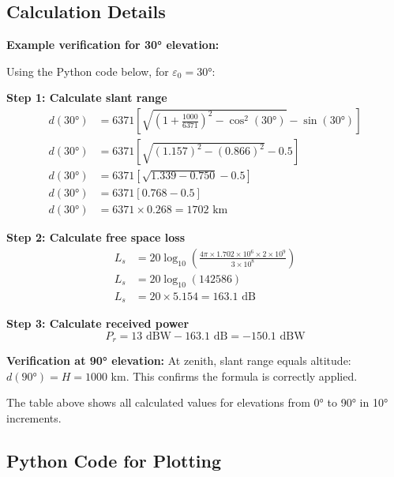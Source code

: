 \documentclass[11pt,letterpaper]{article}
\begin{document}
\subsection{Calculation Details}

\textbf{Example verification for 30° elevation:}

Using the Python code below, for $\varepsilon_0 = 30°$:

\textbf{Step 1: Calculate slant range}
\begin{align}
d(30°) &= 6371 \left[\sqrt{\left(1 + \frac{1000}{6371}\right)^2 - \cos^2(30°)} - \sin(30°)\right] \\
d(30°) &= 6371 \left[\sqrt{(1.157)^2 - (0.866)^2} - 0.5\right] \\
d(30°) &= 6371 \left[\sqrt{1.339 - 0.750} - 0.5\right] \\
d(30°) &= 6371 \left[0.768 - 0.5\right] \\
d(30°) &= 6371 \times 0.268 = 1702 \text{ km}
\end{align}

\textbf{Step 2: Calculate free space loss}
\begin{align}
L_s &= 20 \log_{10}\left(\frac{4\pi \times 1.702 \times 10^6 \times 2 \times 10^9}{3 \times 10^8}\right) \\
L_s &= 20 \log_{10}(142586) \\
L_s &= 20 \times 5.154 = 163.1 \text{ dB}
\end{align}

\textbf{Step 3: Calculate received power}
\begin{equation}
P_r = 13 \text{ dBW} - 163.1 \text{ dB} = -150.1 \text{ dBW}
\end{equation}

\textbf{Verification at 90° elevation:} At zenith, slant range equals altitude: $d(90°) = H = 1000$ km. This confirms the formula is correctly applied.

The table above shows all calculated values for elevations from 0° to 90° in 10° increments.

\subsection{Python Code for Plotting}
\end{document}

